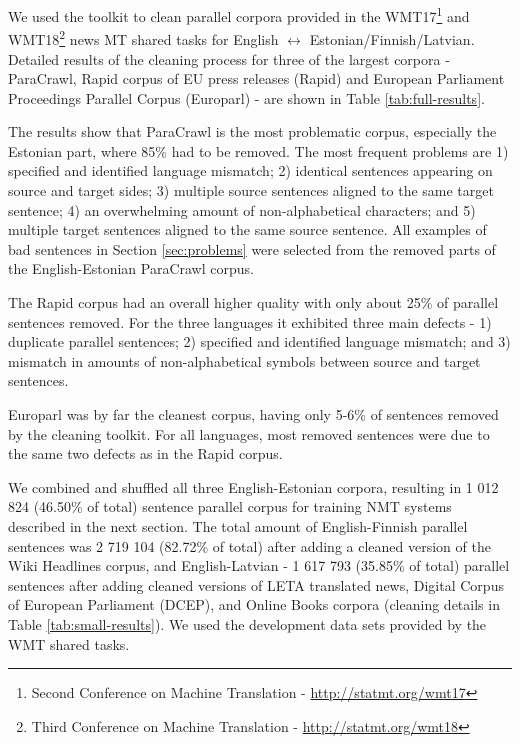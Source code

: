 \documentclass{IOS-Book-Article}
\begin{document}
We used the toolkit to clean parallel corpora provided in the WMT17\footnote{Second Conference on Machine Translation - \url{http://statmt.org/wmt17}} and WMT18\footnote{Third Conference on Machine Translation - \url{http://statmt.org/wmt18}} news MT shared tasks for English $\leftrightarrow$ Estonian/Finnish/Latvian. Detailed results of the cleaning process for three of the largest corpora - ParaCrawl, Rapid corpus of EU press releases (Rapid) and European Parliament Proceedings Parallel Corpus (Europarl) - are shown in Table \ref{tab:full-results}.

The results show that ParaCrawl is the most problematic corpus, especially the Estonian part, where 85\% had to be removed. The most frequent problems are 1) specified and identified language mismatch; 2) identical sentences appearing on source and target sides; 3) multiple source sentences aligned to the same target sentence; 4) an overwhelming amount of non-alphabetical characters; and 5) multiple target sentences aligned to the same source sentence. All examples of bad sentences in Section \ref{sec:problems} were selected from the removed parts of the English-Estonian ParaCrawl corpus.

The Rapid corpus had an overall higher quality with only about 25\% of parallel sentences removed. For the three languages it exhibited three main defects - 1) duplicate parallel sentences; 2) specified and identified language mismatch; and 3) mismatch in amounts of non-alphabetical symbols between source and target sentences.

Europarl was by far the cleanest corpus, having only 5-6\% of sentences removed by the cleaning toolkit. For all languages, most removed sentences were due to the same two defects as in the Rapid corpus.

We combined and shuffled all three English-Estonian corpora, resulting in 1 012 824 (46.50\% of total) sentence parallel corpus for training NMT systems described in the next section. The total amount of English-Finnish parallel sentences was 2 719 104 (82.72\% of total) after adding a cleaned version of the Wiki Headlines corpus, and English-Latvian - 1 617 793 (35.85\% of total) parallel sentences after adding cleaned versions of LETA translated news, Digital Corpus of European Parliament (DCEP), and Online Books corpora (cleaning details in Table \ref{tab:small-results}). We used the development data sets provided by the WMT shared tasks.
\end{document}
